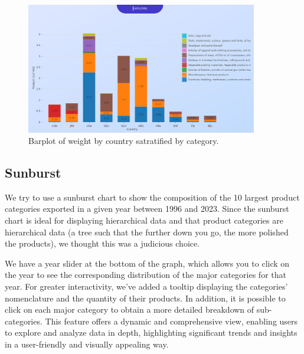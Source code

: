 \documentclass[12pt,a4]{article}
\begin{document}
\begin{figure}[H]
    \centering
    \includegraphics[width=0.9\textwidth]{assets/bar2.png}
    \caption{Barplot of weight by country satratified by category.}
\end{figure}

\subsection{Sunburst}
We try to use a sunburst chart to show the composition of the 10 largest product categories exported in a given year between 1996 and 2023. Since the sunburst chart is ideal for displaying hierarchical data and that product categories are hierarchical data (a tree such 
that the further down you go, the more polished the products), we thought this was a judicious choice.

We have a year slider at the bottom of the graph, which allows you to click on the year to see the corresponding distribution of the major categories for that year. For greater interactivity, we've added a tooltip displaying the categories' nomenclature and the quantity of their products. In addition, it is possible to click on each major category to obtain a more detailed breakdown of sub-categories. This feature offers a dynamic and comprehensive view, enabling users to explore and analyze data in depth, highlighting significant trends and insights in a user-friendly and visually appealing way.
\end{document}
